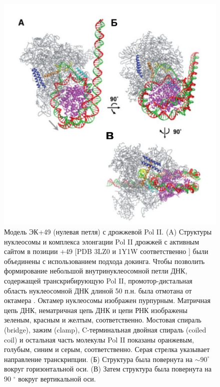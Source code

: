 \begin{figure} [H]
    \centering
    \includegraphics{images/p6/p6_2/p6_2_nar2014_f1.pdf}
    \caption[Модель ЭК+49 (нулевая петля) с дрожжевой Pol II]{Модель ЭК+49 (нулевая петля) с дрожжевой Pol II. (A) Структуры нуклеосомы и комплекса элонгации Pol II дрожжей с активным сайтом в позиции +49 [PDB 3LZ0 и 1Y1W соответственно \cite{vasudevan_crystal_2010,kettenberger_complete_2004}] были объединены с использованием подхода докинга. Чтобы позволить формирование небольшой внутринуклеосомной петли ДНК, содержащей транскрибирующую Pol II, промотор-дистальная область нуклеосомной ДНК длиной 50 п.н. была отмотана от октамера \cite{kulaeva_mechanism_2009}. Октамер нуклеосомы изображен пурпурным. Матричная цепь ДНК, нематричная цепь ДНК и цепи РНК изображены зеленым, красным и желтым, соответственно. Мостовая спираль (bridge), зажим (clamp), C-терминальная двойная спираль (coiled coil) и остальная часть молекулы Pol II показаны оранжевым, голубым, синим и серым, соответственно. Серая стрелка указывает направление транскрипции. (Б) Структура была повернута на $\sim 90^{\circ}$ вокруг горизонтальной оси. (В) Затем структура была повернута на 90 $^{\circ}$ вокруг вертикальной оси.}
    \label{fig:p6_2_n2014_f1}
\end{figure}
   
